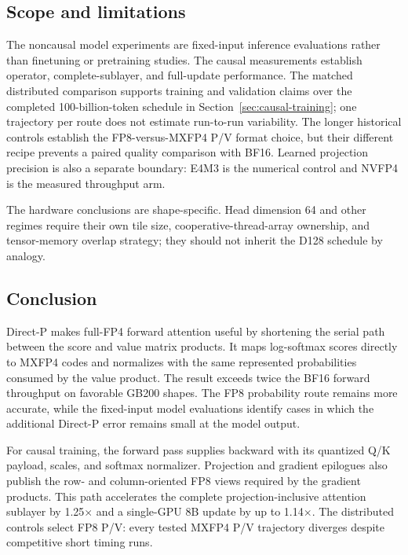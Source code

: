 \subsection{Scope and limitations}

The noncausal model experiments are fixed-input inference evaluations rather
than finetuning or pretraining studies.  The causal measurements establish
operator, complete-sublayer, and full-update performance.  The matched
distributed comparison supports training and validation claims over the
completed 100-billion-token schedule in Section~\ref{sec:causal-training};
one trajectory per route does not estimate run-to-run variability.  The longer historical
controls establish the FP8-versus-MXFP4 P/V format choice, but their different
recipe prevents a paired quality comparison with BF16.  Learned projection
precision is also a separate boundary: E4M3 is the numerical control and
NVFP4 is the measured throughput arm.

The hardware conclusions are shape-specific.  Head dimension 64 and other
regimes require their own tile size, cooperative-thread-array ownership, and
tensor-memory overlap strategy; they should not inherit the D128 schedule by
analogy.

\subsection{Conclusion}

Direct-P makes full-FP4 forward attention useful by shortening the serial path
between the score and value matrix products.  It maps log-softmax scores
directly to MXFP4 codes and normalizes with the same represented probabilities
consumed by the value product.  The result exceeds twice the BF16 forward
throughput on favorable GB200 shapes.  The FP8 probability route remains more
accurate, while the fixed-input model evaluations identify cases in which the
additional Direct-P error remains small at the model output.

For causal training, the forward pass supplies backward with its quantized
Q/K payload, scales, and softmax normalizer.  Projection and gradient
epilogues also publish the row- and column-oriented FP8 views required by the
gradient products.  This path accelerates the complete projection-inclusive
attention sublayer by 1.25$\times$ and a single-GPU 8B update by up to
1.14$\times$.  The distributed controls select FP8 P/V: every tested MXFP4
P/V trajectory diverges despite competitive short timing runs.

